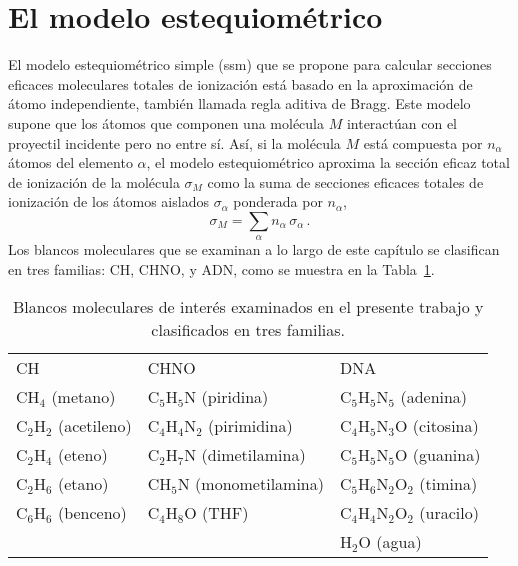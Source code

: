 \section{El modelo estequiométrico}
\label{sec:SSM}

El modelo estequiométrico simple (\acs{ssm}) que se propone para 
calcular secciones eficaces moleculares totales de ionización está 
basado en la aproximación de átomo independiente, también llamada regla 
aditiva de Bragg. Este modelo supone que los átomos que componen una 
molécula $M$ interactúan con el proyectil incidente pero no entre sí. 
Así, si la molécula $M$ está compuesta por $n_{\alpha}$ átomos del 
elemento $\alpha$, el modelo estequiométrico aproxima la sección eficaz 
total de ionización de la molécula $\sigma_M$ como la suma de secciones 
eficaces totales de ionización de los átomos aislados 
$\sigma_{\alpha}$ ponderada por $n_{\alpha}$, 
\begin{equation}
\sigma_{M}=\sum_{\alpha} n_{\alpha}\,\sigma_{\alpha}\,.  
\label{eq:sumion}
\end{equation}
Los blancos moleculares que se examinan a lo largo de este capítulo se 
clasifican en tres familias: CH, CHNO, y ADN, como se muestra en la 
Tabla~\ref{tab:families}.

\begin{table}
\begin{center}
\begin{tabularx}{\textwidth}{
>{\centering\arraybackslash}p{}
>{\centering\arraybackslash}p{}
>{\centering\arraybackslash}p{}}
\rowcolor{mydarkgray} 
CH & CHNO & DNA \\
CH$_4$ (metano) & C$_5$H$_5$N (piridina)       & C$_5$H$_5$N$_5$ (adenina) \\
\rowcolor{mygray} 
C$_2$H$_2$ (acetileno) & C$_4$H$_4$N$_2$ (pirimidina)     & C$_4$H$_5$N$_3$O (citosina) \\
C$_2$H$_4$ (eteno)     & C$_2$H$_7$N     (dimetilamina)   & C$_5$H$_5$N$_5$O (guanina) \\
\rowcolor{mygray} 
C$_2$H$_6$ (etano)     & CH$_5$N         (monometilamina) & C$_5$H$_6$N$_2$O$_2$ (timina) \\
C$_6$H$_6$ (benceno)   & C$_4$H$_8$O     (THF)            & C$_4$H$_4$N$_2$O$_2$ (uracilo) \\
\rowcolor{mygray} 
 & & H$_2$O (agua) \\
\end{tabularx}
\caption[Blancos moleculares examinados y clasificados en tres 
familias.]
{Blancos moleculares de interés examinados en el presente trabajo y 
clasificados en tres familias.}
\label{tab:families}
\end{center}
\end{table}

